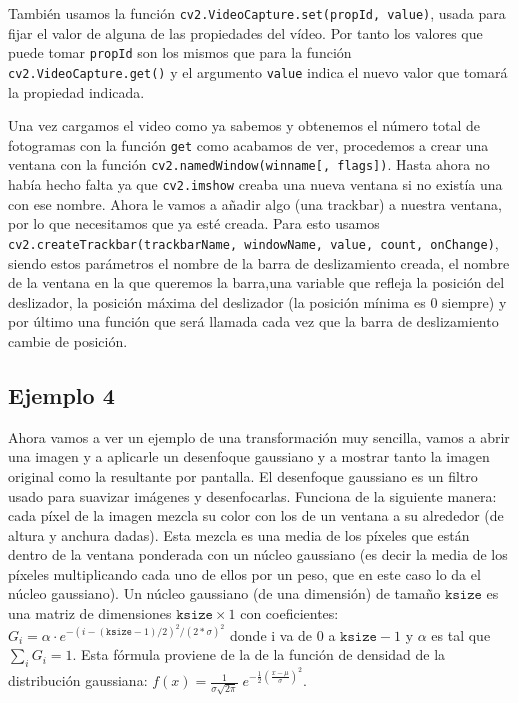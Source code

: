 \documentclass[a4paper,openright, 12pt]{book}
\begin{document}
También usamos la función \lstinline|cv2.VideoCapture.set(propId, value)|, usada para fijar el valor de alguna de las propiedades del vídeo. Por tanto los valores que puede tomar \lstinline|propId| son los mismos que para la función \lstinline|cv2.VideoCapture.get()| y el argumento \lstinline|value| indica el nuevo valor que tomará la propiedad indicada.

Una vez cargamos el video como ya sabemos y obtenemos el número total de fotogramas con la función \lstinline|get| como acabamos de ver, procedemos a crear una ventana con la función \lstinline|cv2.namedWindow(winname[, flags])|.
Hasta ahora no había hecho falta ya que \lstinline|cv2.imshow| creaba una nueva ventana si no existía una con ese nombre.
Ahora le vamos a añadir algo (una trackbar) a nuestra ventana, por lo que necesitamos que ya esté creada.
Para esto usamos \lstinline|cv2.createTrackbar(trackbarName, windowName, value, count, onChange)|, siendo estos parámetros el nombre de la barra de deslizamiento creada, el nombre de la ventana en la que queremos la barra,una variable que refleja la posición del deslizador, la posición máxima del deslizador (la posición mínima es 0 siempre) y por último una función que será llamada cada vez que la barra de deslizamiento cambie de posición.

\newpage
\enlargethispage{3cm}
\subsection*{Ejemplo 4}
Ahora vamos a ver un ejemplo de una transformación muy sencilla, vamos a abrir una imagen y a aplicarle un desenfoque gaussiano y a mostrar tanto la imagen original como la resultante por pantalla. El desenfoque gaussiano es un filtro usado para suavizar imágenes y desenfocarlas. Funciona de la siguiente manera: cada píxel de la imagen mezcla su color con los de un ventana a su alrededor (de altura y anchura dadas). Esta mezcla es una media de los píxeles que están dentro de la ventana ponderada con un núcleo gaussiano (es decir la media de los píxeles multiplicando cada uno de ellos por un peso, que en este caso lo da el núcleo gaussiano). Un núcleo gaussiano (de una dimensión) de tamaño $\texttt{ksize}$ es una matriz de dimensiones $ \texttt{ksize}\times1$ con coeficientes:
$ G_i= \alpha \cdot e^{-(i-( \texttt{ksize} -1)/2)^2/(2* \sigma )^2}$ donde i va de $0$ a $\texttt{ksize}-1$ y $\alpha$ es tal que  $\sum_i G_i=1$. Esta fórmula proviene de la de la función de densidad de la distribución gaussiana: $f(x)=\frac1{\sigma\sqrt{2\pi}}\; e^{ - \frac{1}{2} \left(\frac{x-\mu}{\sigma}\right)^2}$.
\end{document}

